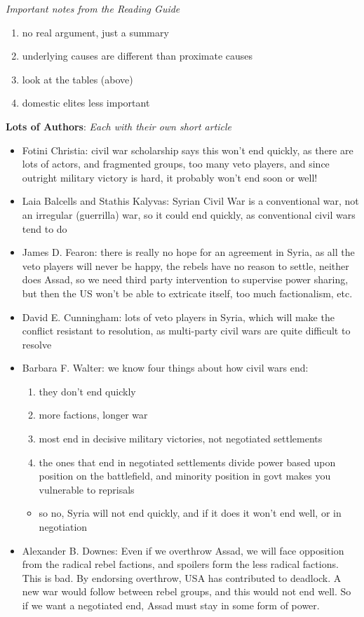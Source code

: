 \documentclass{article}
\begin{document}
\textit{Important notes from the Reading Guide}
\begin{enumerate}
    \item no real argument, just a summary
    \item underlying causes are different than proximate causes
    \item look at the tables (above)
    \item domestic elites less important
\end{enumerate}
\bigskip
\textbf{Lots of Authors}: \textit{Each with their own short article}
\begin{itemize}
    \item Fotini Christia: civil war scholarship says this won't end quickly, as there are lots of actors, and fragmented groups, too many veto players, and since outright military victory is hard, it probably won't end soon or well!
    \item Laia Balcells and Stathis Kalyvas: Syrian Civil War is a conventional war, not an irregular (guerrilla) war, so it could end quickly, as conventional civil wars tend to do
    \item James D. Fearon: there is really no hope for an agreement in Syria, as all the veto players will never be happy, the rebels have no reason to settle, neither does Assad, so we need third party intervention to supervise power sharing, but then the US won't be able to extricate itself, too much factionalism, etc.
    \item David E. Cunningham: lots of veto players in Syria, which will make the conflict resistant to resolution, as multi-party civil wars are quite difficult to resolve
    \item Barbara F. Walter: we know four things about how civil wars end:
    \begin{enumerate}
        \item they don't end quickly
        \item more factions, longer war
        \item most end in decisive military victories, not negotiated settlements
        \item the ones that end in negotiated settlements divide power based upon position on the battlefield, and minority position in govt makes you vulnerable to reprisals
    \end{enumerate}
    \begin{itemize}
        \item so no, Syria will not end quickly, and if it does it won't end well, or in negotiation
    \end{itemize}
    \item Alexander B. Downes: Even if we overthrow Assad, we will face opposition from the radical rebel factions, and spoilers form the less radical factions. This is bad. By endorsing overthrow, USA has contributed to deadlock. A new war would follow between rebel groups, and this would not end well. So if we want a negotiated end, Assad must stay in some form of power.
\end{itemize}
\end{document}
